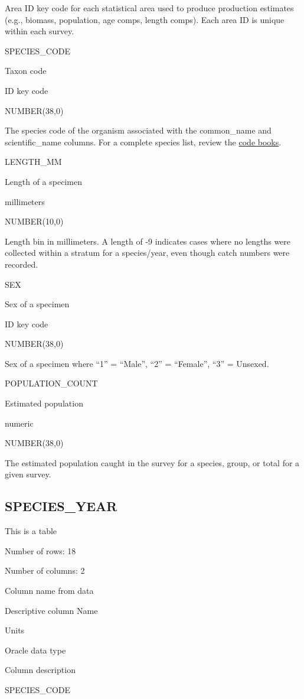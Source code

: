 \documentclass[
  letterpaper,
  oneside,
  open=any]{scrbook}
\begin{document}
Area ID key code for each statistical area used to produce production
estimates (e.g., biomass, population, age comps, length comps). Each
area ID is unique within each survey.

SPECIES\_CODE

Taxon code

ID key code

NUMBER(38,0)

The species code of the organism associated with the common\_name and
scientific\_name columns. For a complete species list, review the
\href{https://www.fisheries.noaa.gov/resource/document/groundfish-survey-species-code-manual-and-data-codes-manual}{code
books}.

LENGTH\_MM

Length of a specimen

millimeters

NUMBER(10,0)

Length bin in millimeters. A length of -9 indicates cases where no
lengths were collected within a stratum for a species/year, even though
catch numbers were recorded.

SEX

Sex of a specimen

ID key code

NUMBER(38,0)

Sex of a specimen where ``1'' = ``Male'', ``2'' = ``Female'', ``3'' =
Unsexed.

POPULATION\_COUNT

Estimated population

numeric

NUMBER(38,0)

The estimated population caught in the survey for a species, group, or
total for a given survey.

\subsection{SPECIES\_YEAR}\label{species_year}

This is a table

Number of rows: 18

Number of columns: 2

Column name from data

Descriptive column Name

Units

Oracle data type

Column description

SPECIES\_CODE
\end{document}
